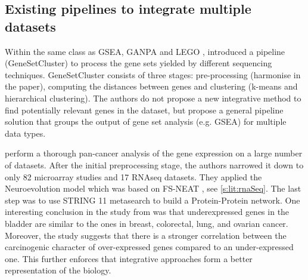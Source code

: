 


\subsection*{Existing pipelines to integrate multiple datasets} \label{s:pipelines}


Within the same class as GSEA, GANPA and LEGO \citep{Fan2020-yb, Dong2016-zs}, \citet{Ewing2020-os} introduced a pipeline (GeneSetCluster) to process the gene sets yielded by different sequencing techniques. GeneSetCluster consists of three stages: pre-processing (harmonise in the paper), computing the distances between genes and clustering (k-means and hierarchical clustering). The authors do not propose a new integrative method to find potentially relevant genes in the dataset, but propose a general pipeline solution that groups the output of gene set analysis (e.g. GSEA) for multiple data types.

\citet{Feltes2020-bz} perform a thorough pan-cancer analysis of the gene expression on a large number of datasets. After the initial preprocessing stage, the authors narrowed it down to only 82 microarray studies and 17 RNAseq datasets. They applied the Neuroevolution model \citep{Grisci2019-xn} which was based on FS-NEAT \citep{Whiteson2005-dn}, see \cref{s:lit:rnaSeq}. The last step was to use STRING 11 \citep{Szklarczyk2019-pu} metasearch to build a Protein-Protein network. One interesting conclusion in the study from \citet{Feltes2020-bz} was that underexpressed genes in the bladder are similar to the ones in breast, colorectal, lung, and ovarian cancer. Moreover, the study suggests that there is a stronger correlation between the carcinogenic character of over-expressed genes compared to an under-expressed one. This further enforces that integrative approaches form a better representation of the biology.

